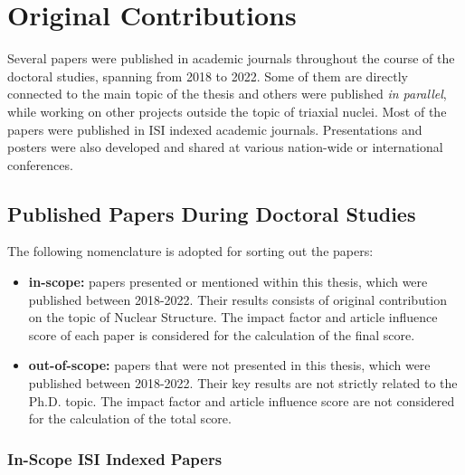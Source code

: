\chapter{Original Contributions}
\label{appendix:contributions}

Several papers were published in academic journals throughout the course of the doctoral studies, spanning from 2018 to 2022. Some of them are directly connected to the main topic of the thesis and others were published \emph{in parallel}, while working on other projects outside the topic of triaxial nuclei. Most of the papers were published in ISI indexed academic journals. Presentations and posters were also developed and shared at various nation-wide or international conferences.

\section{Published Papers During Doctoral Studies}

The following nomenclature is adopted for sorting out the papers:
\begin{itemize}
    \item \textbf{in-scope:} papers presented or mentioned within this thesis, which were published between 2018-2022. Their results consists of original contribution on the topic of Nuclear Structure. The impact factor and article influence score of each paper is considered for the calculation of the final score.
    \item \textbf{out-of-scope:} papers that were not presented in this thesis, which were published between 2018-2022. Their key results are not strictly related to the Ph.D. topic. The impact factor and article influence score are not considered for the calculation of the total score.
\end{itemize}

\subsection{In-Scope ISI Indexed Papers}

